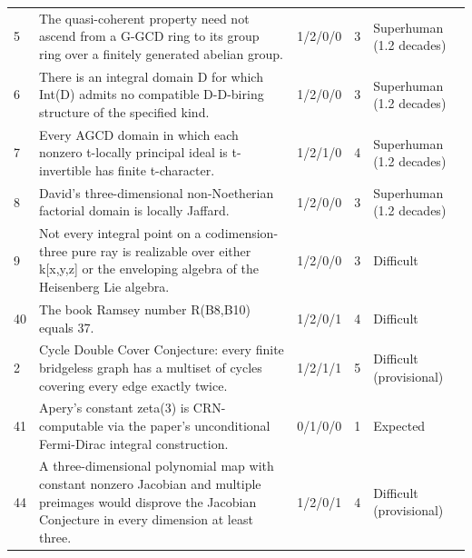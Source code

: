 \begin{landscape}
\begin{longtable}{@{}L{14mm}L{91mm}C{25mm}C{12mm}L{43mm}@{}}
5 & The quasi-coherent property need not ascend from a G-GCD ring to its group ring over a finitely generated abelian group. & 1/2/0/0 & 3 & Superhuman (1.2 decades) \\
6 & There is an integral domain D for which Int(D) admits no compatible D-D-biring structure of the specified kind. & 1/2/0/0 & 3 & Superhuman (1.2 decades) \\
7 & Every AGCD domain in which each nonzero t-locally principal ideal is t-invertible has finite t-character. & 1/2/1/0 & 4 & Superhuman (1.2 decades) \\
8 & David's three-dimensional non-Noetherian factorial domain is locally Jaffard. & 1/2/0/0 & 3 & Superhuman (1.2 decades) \\
9 & Not every integral point on a codimension-three pure ray is realizable over either k[x,y,z] or the enveloping algebra of the Heisenberg Lie algebra. & 1/2/0/0 & 3 & Difficult \\
40 & The book Ramsey number R(B8,B10) equals 37. & 1/2/0/1 & 4 & Difficult \\
2 & Cycle Double Cover Conjecture: every finite bridgeless graph has a multiset of cycles covering every edge exactly twice. & 1/2/1/1 & 5 & Difficult (provisional) \\
41 & Apery's constant zeta(3) is CRN-computable via the paper's unconditional Fermi-Dirac integral construction. & 0/1/0/0 & 1 & Expected \\
44 & A three-dimensional polynomial map with constant nonzero Jacobian and multiple preimages would disprove the Jacobian Conjecture in every dimension at least three. & 1/2/0/1 & 4 & Difficult (provisional) \\
\end{longtable}
\end{landscape}
